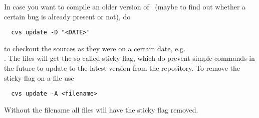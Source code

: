 In case you want to compile an older version of \FORM\ (maybe to find out
whether a certain bug is already present or not), do
\begin{verbatim}
  cvs update -D "<DATE>"
\end{verbatim}
to checkout the sources as they were on a certain date, e.g. \\
. The files will get the so-called sticky flag,
which do prevent simple  commands in the future to update to the
latest version from the repository. To remove the sticky flag on a file use
\begin{verbatim}
  cvs update -A <filename>
\end{verbatim}
Without the filename all files will have the sticky flag removed.

